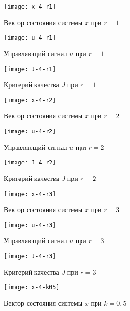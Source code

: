 \documentclass[14pt, a4paper]{extarticle}
\begin{document}
	\begin{figure}[H]
		\centering
		\texttt{[image: x-4-r1]}
		\caption{Вектор состояния системы $x$ при $r=1$}
		\label{fig:x-4-r1}
	\end{figure}
	
	\begin{figure}[H]
		\centering
		\texttt{[image: u-4-r1]}
		\caption{Управляющий сигнал $u$ при $r=1$}
		\label{fig:u-4-r1}
	\end{figure}
	
	\begin{figure}[H]
		\centering
		\texttt{[image: J-4-r1]}
		\caption{Критерий качества $J$ при $r=1$}
		\label{fig:J-4-r1}
	\end{figure}

	\begin{figure}[H]
		\centering
		\texttt{[image: x-4-r2]}
		\caption{Вектор состояния системы $x$ при $r=2$}
		\label{fig:x-4-r2}
	\end{figure}
	
	\begin{figure}[H]
		\centering
		\texttt{[image: u-4-r2]}
		\caption{Управляющий сигнал $u$ при $r=2$}
		\label{fig:u-4-r2}
	\end{figure}
	
	\begin{figure}[H]
		\centering
		\texttt{[image: J-4-r2]}
		\caption{Критерий качества $J$ при $r=2$}
		\label{fig:J-4-r2}
	\end{figure}

	\begin{figure}[H]
		\centering
		\texttt{[image: x-4-r3]}
		\caption{Вектор состояния системы $x$ при $r=3$}
		\label{fig:x-4-r3}
	\end{figure}
	
	\begin{figure}[H]
		\centering
		\texttt{[image: u-4-r3]}
		\caption{Управляющий сигнал $u$ при $r=3$}
		\label{fig:u-4-r3}
	\end{figure}
	
	\begin{figure}[H]
		\centering
		\texttt{[image: J-4-r3]}
		\caption{Критерий качества $J$ при $r=3$}
		\label{fig:J-4-r3}
	\end{figure}
	
	\begin{figure}[H]
		\centering
		\texttt{[image: x-4-k05]}
		\caption{Вектор состояния системы $x$ при $k=0,5$}
		\label{fig:x-4-k05}
	\end{figure}
	
\end{document}
